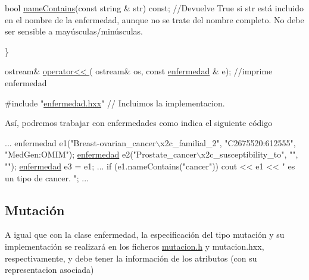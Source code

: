 \begin{DoxyCode}
 \textcolor{keywordtype}{bool} \hyperlink{classenfermedad_a430d035077d6acff0b1ddbd07c2ff205}{nameContains}(\textcolor{keyword}{const} \textcolor{keywordtype}{string} & str) \textcolor{keyword}{const};   \textcolor{comment}{//Devuelve True si str está incluido en el
       nombre de la enfermedad, aunque no se trate del nombre completo. No debe ser sensible a mayúsculas/minúsculas. }

\}

 ostream& \hyperlink{enfermedad_8h_a6cabaa51c1fab8960486e2c2e51071f0}{operator<< }( ostream& os, \textcolor{keyword}{const} \hyperlink{classenfermedad}{enfermedad} & e); \textcolor{comment}{//imprime enfermedad }

\textcolor{preprocessor}{#include "\hyperlink{enfermedad_8hxx}{enfermedad.hxx}"} \textcolor{comment}{// Incluimos la implementacion.}
\end{DoxyCode}


Así, podremos trabajar con enfermedades como indica el siguiente código 
\begin{DoxyCode}
...
enfermedad e1(\textcolor{stringliteral}{"Breast-ovarian\_cancer\(\backslash\)x2c\_familial\_2"}, \textcolor{stringliteral}{"C2675520:612555"}, \textcolor{stringliteral}{"MedGen:OMIM"});
\hyperlink{classenfermedad}{enfermedad} e2(\textcolor{stringliteral}{"Prostate\_cancer\(\backslash\)x2c\_susceptibility\_to"}, \textcolor{stringliteral}{""}, \textcolor{stringliteral}{""});
\hyperlink{classenfermedad}{enfermedad} e3 = e1; 
...
if (e1.nameContains(\textcolor{stringliteral}{"cancer"})) 
  cout << e1 << \textcolor{stringliteral}{" es un tipo de cancer. "}; 
...
\end{DoxyCode}
\hypertarget{index_mutation}{}\subsection{Mutación}\label{index_mutation}
A igual que con la clase enfermedad, la especificación del tipo mutación y su implementación se realizará en los ficheros \hyperlink{mutacion_8h}{mutacion.\+h} y mutacion.\+hxx, respectivamente, y debe tener la información de los atributos (con su representacion asociada)

